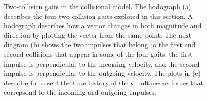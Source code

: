 \begin{figure}[h]		%
\begin{centering}
\end{centering}
\caption[Diagram and Figure: Two-Collision Gaits in the Collisional Model]{Two-collision gaits in the collisional model. The hodograph (a) describes the four two-collision gaits explored in this section. A hodograph describes how a vector changes in both magnitude and direction by plotting the vector from the same point. The next diagram (b) shows the two impulses that belong to the first and second collisions that appear in some of the four gaits: the first impulse is perpendicular to the incoming velocity, and the second impulse is perpendicular to the outgoing velocity. The plots in (c) describe for case 4 the time history of the simultaneous forces that correpsond to the incoming and outgoing impulses. }
\label{fig:Ncollisional}
\end{figure}
%

